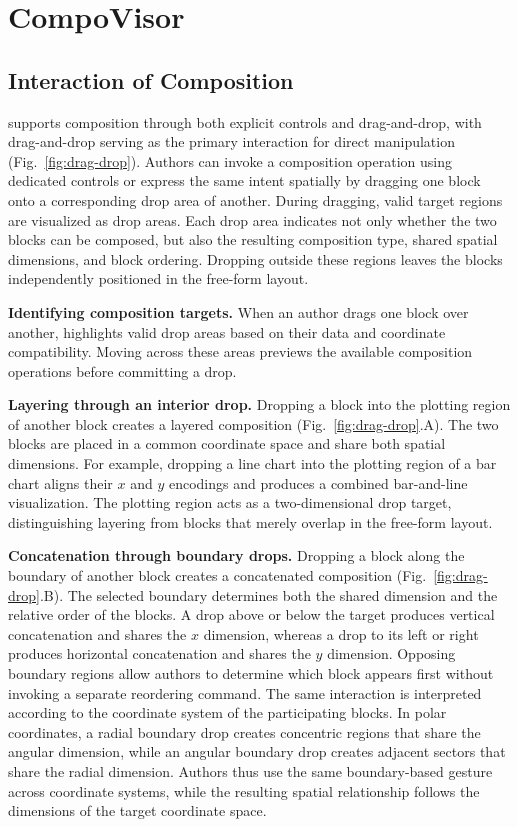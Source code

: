 \section{CompoVisor}

\subsection{Interaction of Composition}
\label{sec:interaction-design}




{\system} supports composition through both explicit controls and
drag-and-drop, with drag-and-drop serving as the primary interaction for
direct manipulation (Fig.~\ref{fig:drag-drop}). Authors can invoke a
composition operation using dedicated controls or express the same intent
spatially by dragging one block onto a corresponding drop area of another.
During dragging, valid target regions are visualized as drop areas. Each drop
area indicates not only whether the two blocks can be composed, but also the
resulting composition type, shared spatial dimensions, and block ordering.
Dropping outside these regions leaves the blocks independently positioned in
the free-form layout.

\textbf{Identifying composition targets.}
When an author drags one block over another, {\system} highlights valid drop
areas based on their data and coordinate compatibility. Moving across these
areas previews the available composition operations before committing a drop.

\textbf{Layering through an interior drop.}
Dropping a block into the plotting region of another block creates a layered
composition (Fig.~\ref{fig:drag-drop}.A). The two blocks are placed in a common
coordinate space and share both spatial dimensions. For example, dropping a
line chart into the plotting region of a bar chart aligns their $x$ and $y$
encodings and produces a combined bar-and-line visualization. The plotting
region acts as a two-dimensional drop target, distinguishing layering from
blocks that merely overlap in the free-form layout.

\textbf{Concatenation through boundary drops.}
Dropping a block along the boundary of another block creates a concatenated
composition (Fig.~\ref{fig:drag-drop}.B). The selected boundary determines both
the shared dimension and the relative order of the blocks. A drop above or
below the target produces vertical concatenation and shares the $x$ dimension,
whereas a drop to its left or right produces horizontal concatenation and
shares the $y$ dimension. Opposing boundary regions allow authors to determine
which block appears first without invoking a separate reordering command.
The same interaction is interpreted according to the coordinate system of the
participating blocks. In polar coordinates, a radial boundary drop creates
concentric regions that share the angular dimension, while an angular boundary
drop creates adjacent sectors that share the radial dimension. Authors thus
use the same boundary-based gesture across coordinate systems, while the
resulting spatial relationship follows the dimensions of the target
coordinate space.

